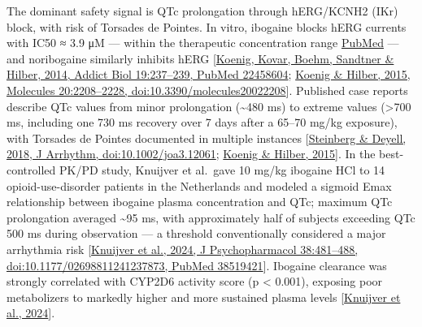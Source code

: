 The dominant safety signal is QTc prolongation through hERG/KCNH2 (IKr) block, with risk of Torsades de Pointes. In vitro, ibogaine blocks hERG currents with IC50 ≈ 3.9 μM --- within the therapeutic concentration range \href{https://pubmed.ncbi.nlm.nih.gov/22458604/}{PubMed} --- and noribogaine similarly inhibits hERG {[}\href{https://pubmed.ncbi.nlm.nih.gov/22458604/}{Koenig, Kovar, Boehm, Sandtner \& Hilber, 2014, Addict Biol 19:237--239, PubMed 22458604}; \href{https://www.mdpi.com/1420-3049/20/2/2208}{Koenig \& Hilber, 2015, Molecules 20:2208--2228, doi:10.3390/molecules20022208}{]}. Published case reports describe QTc values from minor prolongation (\textasciitilde480 ms) to extreme values (\textgreater700 ms, including one 730 ms recovery over 7 days after a 65--70 mg/kg exposure), with Torsades de Pointes documented in multiple instances {[}\href{https://onlinelibrary.wiley.com/doi/full/10.1002/joa3.12061}{Steinberg \& Deyell, 2018, J Arrhythm, doi:10.1002/joa3.12061}; \href{https://www.mdpi.com/1420-3049/20/2/2208}{Koenig \& Hilber, 2015}{]}. In the best-controlled PK/PD study, Knuijver et al.~gave 10 mg/kg ibogaine HCl to 14 opioid-use-disorder patients in the Netherlands and modeled a sigmoid Emax relationship between ibogaine plasma concentration and QTc; maximum QTc prolongation averaged \textasciitilde95 ms, with approximately half of subjects exceeding QTc 500 ms during observation --- a threshold conventionally considered a major arrhythmia risk {[}\href{https://pmc.ncbi.nlm.nih.gov/articles/PMC11102648/}{Knuijver et al., 2024, J Psychopharmacol 38:481--488, doi:10.1177/02698811241237873, PubMed 38519421}{]}. Ibogaine clearance was strongly correlated with CYP2D6 activity score (p \textless{} 0.001), exposing poor metabolizers to markedly higher and more sustained plasma levels {[}\href{https://pmc.ncbi.nlm.nih.gov/articles/PMC11102648/}{Knuijver et al., 2024}{]}.

